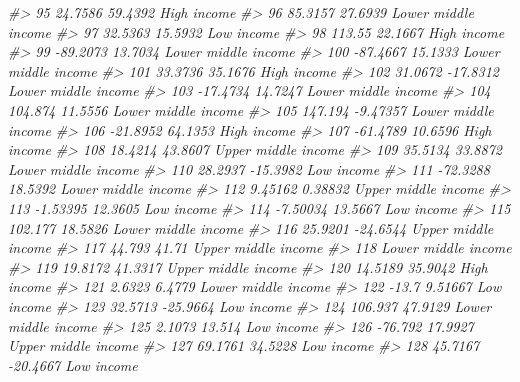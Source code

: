 \documentclass[
  xelatex, ja=standard]{bxjsbook}
\newenvironment{Shaded}{\begin{snugshade}}{\end{snugshade}}
\newcommand{\CommentTok}[1]{\textcolor[rgb]{0.56,0.35,0.01}{\textit{#1}}}
\theoremstyle{definition}
\theoremstyle{definition}
\theoremstyle{definition}
\theoremstyle{definition}
\theoremstyle{remark}
\begin{document}
\begin{Shaded}
\begin{Highlighting}[]
\CommentTok{\#\textgreater{} 95     24.7586    59.4392         High income}
\CommentTok{\#\textgreater{} 96     85.3157    27.6939 Lower middle income}
\CommentTok{\#\textgreater{} 97     32.5363    15.5932          Low income}
\CommentTok{\#\textgreater{} 98      113.55    22.1667         High income}
\CommentTok{\#\textgreater{} 99    {-}89.2073    13.7034 Lower middle income}
\CommentTok{\#\textgreater{} 100   {-}87.4667    15.1333 Lower middle income}
\CommentTok{\#\textgreater{} 101    33.3736    35.1676         High income}
\CommentTok{\#\textgreater{} 102    31.0672   {-}17.8312 Lower middle income}
\CommentTok{\#\textgreater{} 103   {-}17.4734    14.7247 Lower middle income}
\CommentTok{\#\textgreater{} 104    104.874    11.5556 Lower middle income}
\CommentTok{\#\textgreater{} 105    147.194   {-}9.47357 Lower middle income}
\CommentTok{\#\textgreater{} 106   {-}21.8952    64.1353         High income}
\CommentTok{\#\textgreater{} 107   {-}61.4789    10.6596         High income}
\CommentTok{\#\textgreater{} 108    18.4214    43.8607 Upper middle income}
\CommentTok{\#\textgreater{} 109    35.5134    33.8872 Lower middle income}
\CommentTok{\#\textgreater{} 110    28.2937   {-}15.3982          Low income}
\CommentTok{\#\textgreater{} 111   {-}72.3288    18.5392 Lower middle income}
\CommentTok{\#\textgreater{} 112    9.45162    0.38832 Upper middle income}
\CommentTok{\#\textgreater{} 113   {-}1.53395    12.3605          Low income}
\CommentTok{\#\textgreater{} 114   {-}7.50034    13.5667          Low income}
\CommentTok{\#\textgreater{} 115    102.177    18.5826 Lower middle income}
\CommentTok{\#\textgreater{} 116    25.9201   {-}24.6544 Upper middle income}
\CommentTok{\#\textgreater{} 117     44.793      41.71 Upper middle income}
\CommentTok{\#\textgreater{} 118                       Lower middle income}
\CommentTok{\#\textgreater{} 119    19.8172    41.3317 Upper middle income}
\CommentTok{\#\textgreater{} 120    14.5189    35.9042         High income}
\CommentTok{\#\textgreater{} 121     2.6323     6.4779 Lower middle income}
\CommentTok{\#\textgreater{} 122      {-}13.7    9.51667          Low income}
\CommentTok{\#\textgreater{} 123    32.5713   {-}25.9664          Low income}
\CommentTok{\#\textgreater{} 124    106.937    47.9129 Lower middle income}
\CommentTok{\#\textgreater{} 125     2.1073     13.514          Low income}
\CommentTok{\#\textgreater{} 126    {-}76.792    17.9927 Upper middle income}
\CommentTok{\#\textgreater{} 127    69.1761    34.5228          Low income}
\CommentTok{\#\textgreater{} 128    45.7167   {-}20.4667          Low income}

\end{Highlighting}
\end{Shaded}
\end{document}
